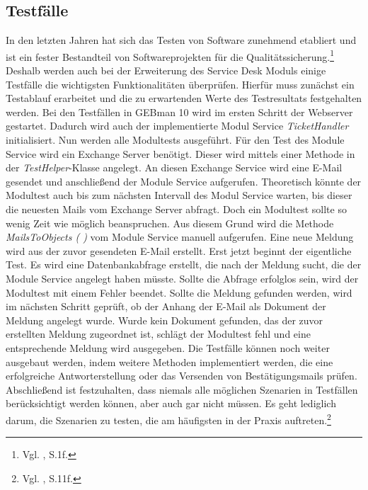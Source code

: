 \subsection{Testfälle}
\noindent
In den letzten Jahren hat sich das Testen von Software zunehmend etabliert und ist ein fester Bestandteil von Softwareprojekten für die Qualitätssicherung.\footnote{Vgl.\citeauthor{Vivenzio} \citeyear{Vivenzio}, S.1f.} Deshalb werden auch bei der Erweiterung des Service Desk Moduls einige Testfälle die wichtigsten Funktionalitäten überprüfen. Hierfür muss zunächst ein Testablauf erarbeitet und  die zu erwartenden Werte des Testresultats festgehalten werden.\newline
Bei den Testfällen in GEBman 10 wird im ersten Schritt der Webserver gestartet. Dadurch wird auch der implementierte Modul Service \textit{TicketHandler} initialisiert. Nun werden alle Modultests ausgeführt. Für den Test des Module Service wird ein Exchange Server benötigt. Dieser wird mittels einer Methode in der \textit{TestHelper}-Klasse angelegt. An diesen Exchange Service wird eine E-Mail gesendet und anschließend der Module Service aufgerufen. Theoretisch könnte der Modultest auch bis zum nächsten Intervall des Modul Service warten, bis dieser die neuesten Mails vom Exchange Server abfragt. Doch ein Modultest sollte so wenig Zeit wie möglich beanspruchen. Aus diesem Grund wird die Methode \textit{MailsToObjects ( )} vom Module Service manuell aufgerufen. Eine neue Meldung wird aus der zuvor gesendeten E-Mail erstellt. Erst jetzt beginnt der eigentliche Test. Es wird eine Datenbankabfrage erstellt, die nach der Meldung sucht, die der Module Service angelegt haben müsste. Sollte die Abfrage erfolglos sein, wird der Modultest mit einem Fehler beendet. Sollte die Meldung gefunden werden, wird im nächsten Schritt geprüft, ob der Anhang der E-Mail als Dokument der Meldung angelegt wurde. Wurde kein Dokument gefunden, das der zuvor erstellten Meldung zugeordnet ist, schlägt der Modultest fehl und eine entsprechende Meldung wird ausgegeben.\newline
Die Testfälle können noch weiter ausgebaut werden, indem weitere Methoden implementiert werden, die eine erfolgreiche Antworterstellung oder das Versenden von Bestätigungsmails prüfen. Abschließend ist festzuhalten, dass niemals alle möglichen Szenarien in Testfällen berücksichtigt werden können, aber auch gar nicht müssen. Es geht lediglich darum, die Szenarien zu testen, die am häufigsten in der Praxis auftreten.\footnote{Vgl. \citeauthor{Witte} \citeyear{Witte}, S.11f.}\\


